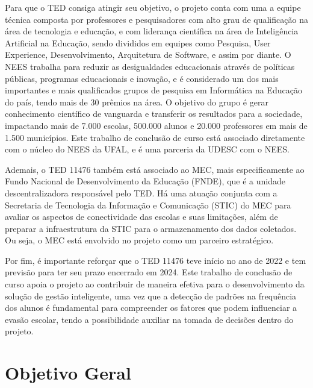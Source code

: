 Para que o TED consiga atingir seu objetivo, o projeto conta com uma a equipe técnica composta por professores e pesquisadores com alto grau de qualificação na área de tecnologia e educação, e com liderança científica na área de Inteligência Artificial na Educação, sendo divididos em equipes como Pesquisa, User Experience, Desenvolvimento, Arquitetura de Software, e assim por diante. %
O NEES trabalha para reduzir as desigualdades educacionais através de políticas públicas, programas educacionais e inovação, e é considerado um dos mais importantes e mais qualificados grupos de pesquisa em Informática na Educação do país, tendo mais de 30 prêmios na área. O objetivo do grupo é gerar conhecimento científico de vanguarda e transferir os resultados para a sociedade, impactando mais de 7.000 escolas, 500.000 alunos e 20.000 professores em mais de 1.500 municípios. Este trabalho de conclusão de curso está associado diretamente com o núcleo do NEES da UFAL, e é uma parceria da UDESC com o NEES. %

Ademais, o TED 11476 também está associado ao MEC, mais especificamente ao Fundo Nacional de Desenvolvimento da Educação (FNDE), que é a unidade descentralizadora responsável pelo TED. Há uma atuação conjunta com a Secretaria de Tecnologia da Informação e Comunicação (STIC) do MEC para avaliar os aspectos de conectividade das escolas e suas limitações, além de preparar a infraestrutura da STIC para o armazenamento dos dados coletados. Ou seja, o MEC está envolvido no projeto como um parceiro estratégico.

Por fim, é importante reforçar que o TED 11476 teve início no ano de 2022 e tem previsão para ter seu prazo encerrado em 2024. Este trabalho de conclusão de curso apoia o projeto ao contribuir de maneira efetiva para o desenvolvimento da solução de gestão inteligente, uma vez que a detecção de padrões na frequência dos alunos é fundamental para compreender os fatores que podem influenciar a evasão escolar, tendo a possibilidade auxiliar na tomada de decisões dentro do projeto.

\section{Objetivo Geral}

